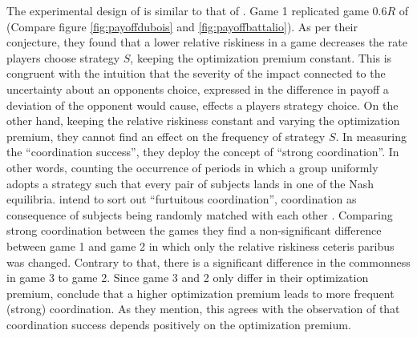 The experimental design of \textcite{dubois_optimization_2012} is similar
to that of \textcite{battalio_optimization_2001}.
Game 1 replicated game $0.6R$  of \textcite{battalio_optimization_2001}  
(Compare figure \ref{fig:payoffdubois} and \ref{fig:payoffbattalio}). 
As per their conjecture, they found that a lower relative riskiness 
in a game decreases the rate players choose strategy $S$, 
keeping the optimization premium constant. This is congruent with 
the intuition that the severity of the impact connected to the uncertainty
about an opponents choice, expressed in
the difference in payoff a deviation of the opponent would cause,
effects a players strategy choice. 
On the other hand, keeping the relative riskiness constant and varying the
optimization premium, they cannot find an effect on the frequency of 
strategy $S$. 
In measuring the ``coordination success'', they deploy the concept of ``strong
coordination''. 
In other words, counting the occurrence of periods in which a group
uniformly adopts a strategy such that every pair of subjects lands in one
of the Nash equilibria. \textcite{dubois_optimization_2012} intend to sort 
out ``furtuitous coordination'', coordination as consequence of subjects being
randomly matched with each other \parencite[373]{dubois_optimization_2012}.
Comparing strong coordination between the games they find a non-significant 
difference between game 1 and game 2 in which only the relative riskiness 
ceteris paribus was changed. Contrary to that, there is a significant 
difference in the commonness in game 3 to game 2.
Since game 3 and 2 only differ in their optimization premium, 
\textcite{dubois_optimization_2012} conclude that a higher optimization
premium leads to more frequent (strong) coordination. 
As they mention, this agrees with the observation of 
\textcite{battalio_optimization_2001} that coordination success depends 
positively on the optimization premium. 

